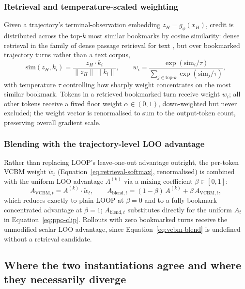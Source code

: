 \documentclass[conference]{IEEEtran}
\begin{document}
\subsubsection{Retrieval and temperature-scaled weighting}
Given a trajectory's terminal-observation embedding $z_H = g_\phi(x_H)$, credit is distributed across the top-$k$ most similar bookmarks by cosine similarity: dense retrieval in the family of dense passage retrieval for text \cite{b_karpukhin2020dpr}, but over bookmarked trajectory turns rather than a text corpus,
\begin{equation}
  \mathrm{sim}(z_H, k_i) = \frac{z_H \cdot k_i}{\lVert z_H \rVert \, \lVert k_i \rVert}, \qquad
  w_i = \frac{\exp(\mathrm{sim}_i / \tau)}{\sum_{j \in \mathrm{top}\text{-}k} \exp(\mathrm{sim}_j / \tau)} ,
  \label{eq:retrieval-softmax}
\end{equation}
with temperature $\tau$ controlling how sharply weight concentrates on the most similar bookmark. Tokens in a retrieved bookmarked turn receive weight $w_i$; all other tokens receive a fixed floor weight $\alpha \in (0,1)$, down-weighted but never excluded; the weight vector is renormalised to sum to the output-token count, preserving overall gradient scale.

\subsubsection{Blending with the trajectory-level LOO advantage}
Rather than replacing LOOP's leave-one-out advantage outright, the per-token VCBM weight $\tilde{w}_t$ (Equation~\eqref{eq:retrieval-softmax}, renormalised) is combined with the uniform LOO advantage $A^{(k)}$ via a mixing coefficient $\beta \in [0,1]$:
\begin{equation}
  A_{\mathrm{VCBM},t} = A^{(k)} \cdot \tilde{w}_t, \qquad
  A_{\mathrm{blend},t} = (1-\beta)\, A^{(k)} + \beta\, A_{\mathrm{VCBM},t} ,
  \label{eq:vcbm-blend}
\end{equation}
which reduces exactly to plain LOOP at $\beta=0$ and to a fully bookmark-concentrated advantage at $\beta=1$; $A_{\mathrm{blend},t}$ substitutes directly for the uniform $A_t$ in Equation~\eqref{eq:ppo-clip}. Rollouts with zero bookmarked turns receive the unmodified scalar LOO advantage, since Equation~\eqref{eq:vcbm-blend} is undefined without a retrieval candidate.

\subsection{Where the two instantiations agree and where they necessarily diverge}
\label{sec:vcbm-comparison}
\end{document}
